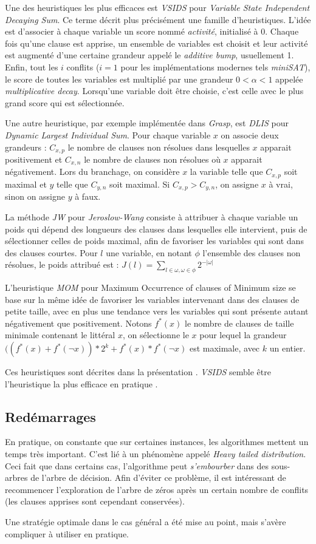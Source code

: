 Une des heuristiques les plus efficaces est \emph{VSIDS} pour \emph{Variable
State Independent Decaying Sum}. Ce terme décrit plus précisément une famille
d'heuristiques. L'idée est d'associer à chaque variable un score nommé
\emph{activité}, initialisé à $0$. Chaque fois qu'une clause est apprise,
un ensemble de variables est choisit et leur activité est augmenté d'une
certaine grandeur appelé le \emph{additive bump}, usuellement 1. Enfin, tout
les $i$ conflits ($i=1$ pour les implémentations modernes tels \emph{miniSAT}),
le score de toutes les variables est multiplié par une grandeur
$0 < \alpha < 1$ appelée \emph{multiplicative decay}. Lorsqu'une variable doit
être choisie, c'est celle avec le plus grand score qui est sélectionnée.

Une autre heuristique, par exemple implémentée dans \emph{Grasp}, est
\emph{DLIS} pour \emph{Dynamic Largest Individual Sum}. Pour chaque variable
$x$ on associe deux grandeurs : $C_{x,p}$ le nombre de clauses non résolues
dans lesquelles $x$ apparait positivement et $C_{x,n}$ le nombre de clauses non
résolues où $x$ apparait négativement. Lors du branchage, on considère $x$ la
variable telle que $C_{x,p}$ soit maximal et $y$ telle que $C_{y,n}$ soit
maximal. Si $C_{x,p} > C_{y,n}$, on assigne $x$ à vrai, sinon on assigne $y$ à
faux.

La méthode \emph{JW} pour \emph{Jeroslow-Wang} consiste à attribuer à chaque
variable un poids qui dépend des longueurs des clauses dans lesquelles elle
intervient, puis de sélectionner celles de poids maximal, afin de favoriser
les variables qui sont dans des clauses courtes. Pour $l$ une variable, en
notant $\phi$ l'ensemble des clauses non résolues, le poids attribué est :
$J(l) = \sum_{l\in\omega,\omega\in\phi} 2^{-|\omega|}$

L'heuristique \emph{MOM} pour {Maximum Occurrence of clauses of Minimum size}
se base sur la même idée de favoriser les variables intervenant dans des
clauses de petite taille, avec en plus une tendance vers les variables qui
sont présente autant négativement que positivement. Notons $f^*(x)$ le nombre
de clauses de taille minimale contenant le littéral $x$, on sélectionne le $x$
pour lequel la grandeur $((f^*(x) + f^*(\neg x)) * 2^k + f^*(x)*f^*(\neg x)$
est maximale, avec $k$ un entier.

Ces heuristiques sont décrites dans la présentation .
\emph{VSIDS} semble être l'heuristique la plus efficace en pratique .

\subsection{Redémarrages}\label{restart}
En pratique, on constante que sur certaines instances, les algorithmes mettent
un temps très important. C'est lié à un phénomène appelé \emph{Heavy tailed
distribution}. 
Ceci fait que dans certains cas, l'algorithme peut \emph{s'embourber} dans des
sous-arbres de l'arbre de décision. Afin d'éviter ce problème, il est
intéressant de recommencer l'exploration de l'arbre de zéros après un certain
nombre de conflits (les clauses apprises sont cependant conservées).

Une stratégie optimale dans le cas général a été mise au point, 
mais s'avère compliquer à utiliser en pratique.

